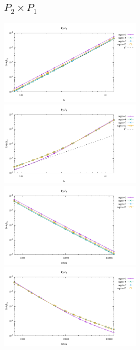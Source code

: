 \subsection*{$P_2\times P_1$}
\begin{center}
\includegraphics[width=7cm]{python_codes/fieldstone_120/results/P2P1-velocity-h.pdf}
\includegraphics[width=7cm]{python_codes/fieldstone_120/results/P2P1-pressure-h.pdf}
\includegraphics[width=7cm]{python_codes/fieldstone_120/results/P2P1-velocity-Nfem.pdf}
\includegraphics[width=7cm]{python_codes/fieldstone_120/results/P2P1-pressure-Nfem.pdf}
\end{center}

